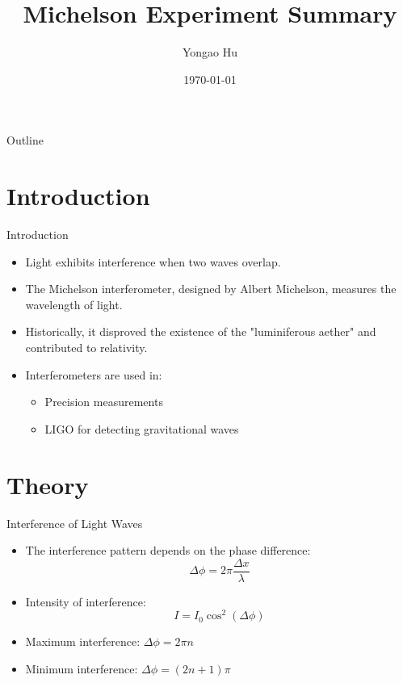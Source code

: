 \documentclass[aspectratio = 169]{beamer}
\title{Michelson Experiment Summary}
\author{Yongao Hu}
\institute{MIT Department of Physics}
\date{\today}
\begin{document}
\begin{frame}
    \titlepage
\end{frame}

\begin{frame}{Outline}
    \tableofcontents
\end{frame}

\section{Introduction}
\begin{frame}{Introduction}
    \begin{itemize}
        \item Light exhibits interference when two waves overlap.
        \item The Michelson interferometer, designed by Albert Michelson, measures the wavelength of light.
        \item Historically, it disproved the existence of the "luminiferous aether" and contributed to relativity.
        \item Interferometers are used in:
        \begin{itemize}
            \item Precision measurements
            \item LIGO for detecting gravitational waves \cite{LIGO2016}
        \end{itemize}
    \end{itemize}
\end{frame}

\section{Theory}
\begin{frame}{Interference of Light Waves}
    \begin{itemize}
        \item The interference pattern depends on the phase difference:
        \[
        \Delta \phi = 2\pi \frac{\Delta x}{\lambda}
        \]
        \item Intensity of interference:
        \[
        I = I_0 \cos^2(\Delta \phi)
        \]
        \item Maximum interference: $\Delta \phi = 2\pi n$
        \item Minimum interference: $\Delta \phi = (2n+1)\pi$
    \end{itemize}
\end{frame}
\end{document}
